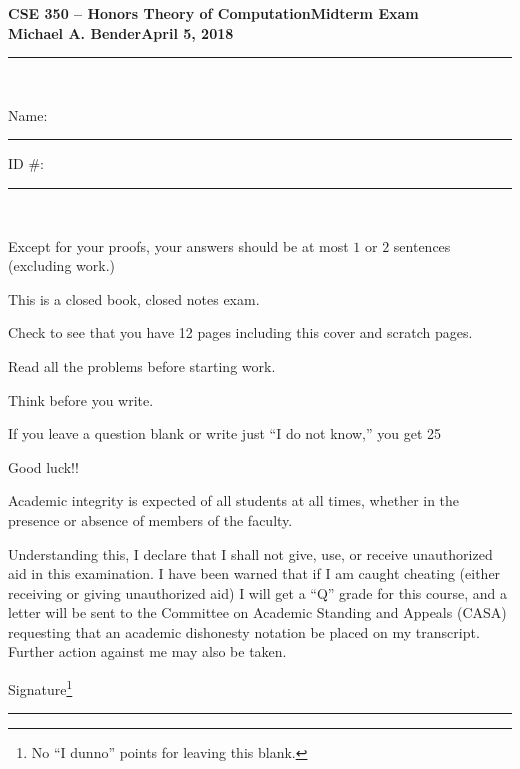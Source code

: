 \documentclass[12pt,fullpage]{article}
\begin{document}
{\bf
\noindent
CSE 350 --  Honors Theory of Computation\hfill             Midterm Exam\\
Michael A. Bender\hfill      April 5, 2018\\
}
\rule{\linewidth}{.01in}
\begin{center}
{\bf ~~~}
\end{center}


\medskip

Name: \rule{2.625in}{.01in} ID \#: \rule{2.5in}{.01in}\\[\bigskipamount]





\begin{compactitem}
\item Except for your proofs, your answers should be at most $1$ or
  $2$ sentences (excluding work.)
\item This is a closed book, closed notes exam.
\item Check to see that you have 12 pages including this cover and
  scratch pages.

\item Read all the problems before starting work.
\item Think before you write.
\item If you leave a question blank or write just ``I do not know,''
  you get 25\
\item Good luck!!
\end{compactitem}

Academic integrity is expected of all students at all times, whether
in the presence or absence of members of the faculty.

Understanding this, I declare that I shall not give, use, or receive
unauthorized aid in this examination.  I have been warned that if I
am caught cheating (either receiving or giving unauthorized aid) I
will get a ``Q'' grade for this course, and a letter will be sent to
the Committee on Academic Standing and Appeals (CASA) requesting
that an academic dishonesty notation be placed on my transcript.
Further action against me may also be taken.



\noindent

Signature\footnote{No ``I dunno'' points for leaving this blank. \smiley} \rule{2.625in}{.01in}






\nopagebreak
\end{document}

